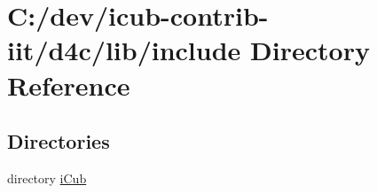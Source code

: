\section{C\+:/dev/icub-\/contrib-\/iit/d4c/lib/include Directory Reference}
\label{dir_5a30104352ef4255dc24354b02eb2d20}
\subsection*{Directories}
\begin{DoxyCompactItemize}
\item 
directory \hyperlink{dir_05906369c2d654c318c8e5f0b9121080}{i\+Cub}
\end{DoxyCompactItemize}
